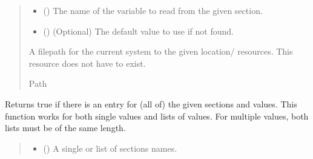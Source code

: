 \documentclass[letterpaper,10pt,english]{sphinxmanual}
\begin{document}
\begin{fulllineitems}
\begin{fulllineitems}
\begin{quote}
\begin{description}
\begin{itemize}
\item {} 
\sphinxAtStartPar
{} () \textendash{} The name of the variable to read from the given section.

\item {} 
\sphinxAtStartPar
{} () \textendash{} (Optional) The default value to use if not found.

\end{itemize}

\sphinxAtStartPar
A filepath for the current system to the given location/
resources. This resource does not have to exist.

\sphinxAtStartPar
Path

\end{description}\end{quote}

\end{fulllineitems}


\begin{fulllineitems}
\label{\detokenize{modules/input/config_handler:qnav.input.config_handler.ConfigHandler.is_value_set}}
\pysigstartsignatures
{}
\pysigstopsignatures
\sphinxAtStartPar
Returns true if there is an entry for (all of) the given sections and
values. This function works for both single values and lists of
values. For multiple values, both lists must be of the same length.
\begin{quote}\begin{description}
\begin{itemize}
\item {} 
\sphinxAtStartPar
{} () \textendash{} A single or list of sections names.


\end{itemize}
\end{description}
\end{quote}
\end{fulllineitems}
\end{fulllineitems}
\end{document}
